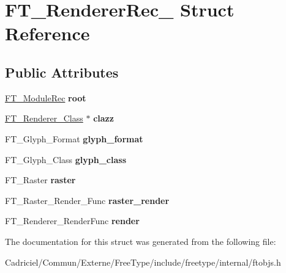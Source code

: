 \hypertarget{struct_f_t___renderer_rec__}{\section{F\-T\-\_\-\-Renderer\-Rec\-\_\- Struct Reference}
\label{struct_f_t___renderer_rec__}
}
\subsection*{Public Attributes}
\begin{DoxyCompactItemize}
\item 
\hypertarget{struct_f_t___renderer_rec___a7c93326898f03a9eb224f57104fa2433}{\hyperlink{struct_f_t___module_rec__}{F\-T\-\_\-\-Module\-Rec} {\bfseries root}}\label{struct_f_t___renderer_rec___a7c93326898f03a9eb224f57104fa2433}

\item 
\hypertarget{struct_f_t___renderer_rec___a2b13c0a776ea7f589f41f576f9c4e8ad}{\hyperlink{struct_f_t___renderer___class__}{F\-T\-\_\-\-Renderer\-\_\-\-Class} $\ast$ {\bfseries clazz}}\label{struct_f_t___renderer_rec___a2b13c0a776ea7f589f41f576f9c4e8ad}

\item 
\hypertarget{struct_f_t___renderer_rec___a478b14f577b633cea7043fb17d404721}{F\-T\-\_\-\-Glyph\-\_\-\-Format {\bfseries glyph\-\_\-format}}\label{struct_f_t___renderer_rec___a478b14f577b633cea7043fb17d404721}

\item 
\hypertarget{struct_f_t___renderer_rec___a38a591be1d20fb2b4d81e48ebb624dd7}{F\-T\-\_\-\-Glyph\-\_\-\-Class {\bfseries glyph\-\_\-class}}\label{struct_f_t___renderer_rec___a38a591be1d20fb2b4d81e48ebb624dd7}

\item 
\hypertarget{struct_f_t___renderer_rec___a9c54a2da84f5892e0563d032ebd1ee09}{F\-T\-\_\-\-Raster {\bfseries raster}}\label{struct_f_t___renderer_rec___a9c54a2da84f5892e0563d032ebd1ee09}

\item 
\hypertarget{struct_f_t___renderer_rec___a6dc07268fc39d9dde130a5708607d19d}{F\-T\-\_\-\-Raster\-\_\-\-Render\-\_\-\-Func {\bfseries raster\-\_\-render}}\label{struct_f_t___renderer_rec___a6dc07268fc39d9dde130a5708607d19d}

\item 
\hypertarget{struct_f_t___renderer_rec___a197bfeb9dde4aef8eee87bc3ea95312e}{F\-T\-\_\-\-Renderer\-\_\-\-Render\-Func {\bfseries render}}\label{struct_f_t___renderer_rec___a197bfeb9dde4aef8eee87bc3ea95312e}

\end{DoxyCompactItemize}


The documentation for this struct was generated from the following file\-:\begin{DoxyCompactItemize}
\item 
Cadriciel/\-Commun/\-Externe/\-Free\-Type/include/freetype/internal/ftobjs.\-h\end{DoxyCompactItemize}
